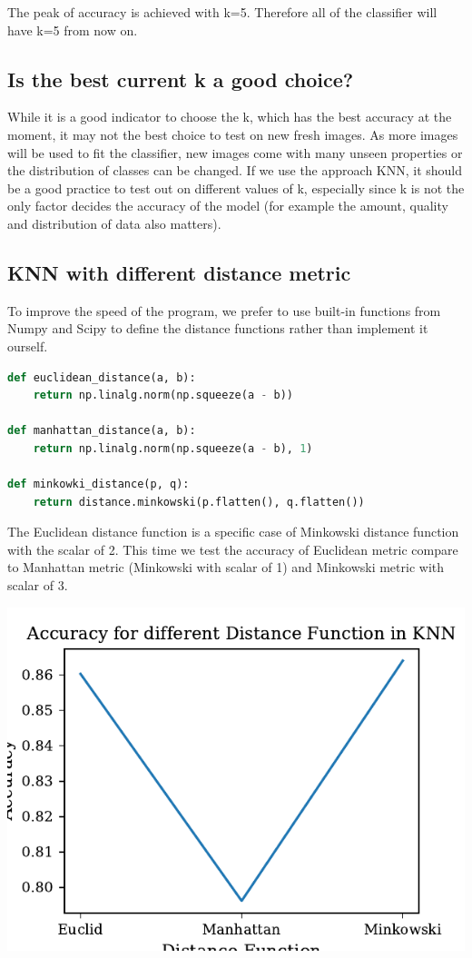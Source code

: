 \documentclass[11pt]{article}
\begin{document}
The peak of accuracy is achieved with k=5. Therefore all of the classifier will have k=5 from now on.

\subsection{Is the best current k a good choice?}

While it is a good indicator to choose the k, which has the best accuracy at the moment, it may not the best choice to test on new fresh images. As more images will be used to fit the classifier, new images come with many unseen properties or the distribution of classes can be changed. If we use the approach KNN, it should be a good practice to test out on different values of k, especially since k is not the only factor decides the accuracy of the model (for example the amount, quality and distribution of data also matters).

\subsection{KNN with different distance metric}

To improve the speed of the program, we prefer to use built-in functions from Numpy and Scipy to define the distance functions rather than implement it ourself.

\begin{lstlisting}[language=python, caption=distance functions]
def euclidean_distance(a, b):
    return np.linalg.norm(np.squeeze(a - b))

def manhattan_distance(a, b):
    return np.linalg.norm(np.squeeze(a - b), 1)

def minkowki_distance(p, q):
    return distance.minkowski(p.flatten(), q.flatten())
\end{lstlisting}

The Euclidean distance function is a specific case of Minkowski distance function with the scalar of 2. This time we test the accuracy of Euclidean metric compare to Manhattan metric (Minkowski with scalar of 1) and Minkowski metric with scalar of 3.

\includegraphics{figures/1e_knn_acc_dist.pdf}
\end{document}
